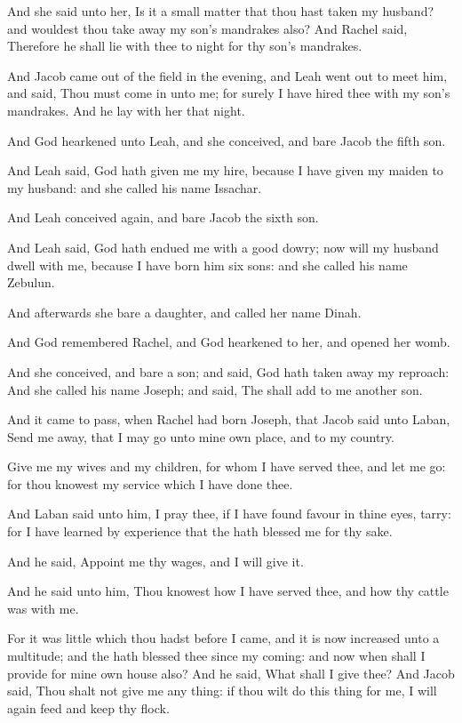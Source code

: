 \verse And she said unto her, Is it a small matter that thou hast taken my husband? and wouldest thou take away my son's mandrakes also? And Rachel said, Therefore he shall lie with thee to night for thy son's mandrakes.

\verse And Jacob came out of the field in the evening, and Leah went out to meet him, and said, Thou must come in unto me; for surely I have hired thee with my son's mandrakes. And he lay with her that night.

\verse And God hearkened unto Leah, and she conceived, and bare Jacob the fifth son.

\verse And Leah said, God hath given me my hire, because I have given my maiden to my husband: and she called his name Issachar.

\verse And Leah conceived again, and bare Jacob the sixth son.

\verse And Leah said, God hath endued me with a good dowry; now will my husband dwell with me, because I have born him six sons: and she called his name Zebulun.

\verse And afterwards she bare a daughter, and called her name Dinah.

\verse And God remembered Rachel, and God hearkened to her, and opened her womb.

\verse And she conceived, and bare a son; and said, God hath taken away my reproach: \verse And she called his name Joseph; and said, The \LORD shall add to me another son.

\verse And it came to pass, when Rachel had born Joseph, that Jacob said unto Laban, Send me away, that I may go unto mine own place, and to my country.

\verse Give me my wives and my children, for whom I have served thee, and let me go: for thou knowest my service which I have done thee.

\verse And Laban said unto him, I pray thee, if I have found favour in thine eyes, tarry: for I have learned by experience that the \LORD hath blessed me for thy sake.

\verse And he said, Appoint me thy wages, and I will give it.

\verse And he said unto him, Thou knowest how I have served thee, and how thy cattle was with me.

\verse For it was little which thou hadst before I came, and it is now increased unto a multitude; and the \LORD hath blessed thee since my coming: and now when shall I provide for mine own house also?  \verse And he said, What shall I give thee? And Jacob said, Thou shalt not give me any thing: if thou wilt do this thing for me, I will again feed and keep thy flock.

